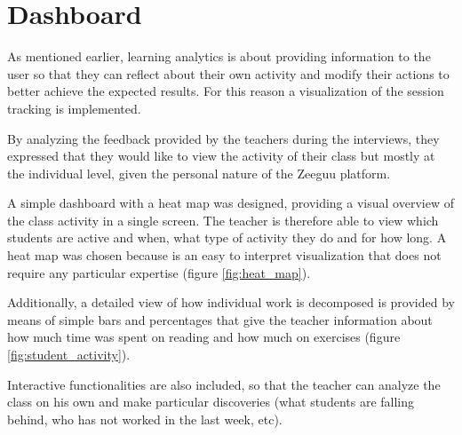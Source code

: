 \chapter{Dashboard}\label{p02:dashboard}

As mentioned earlier, learning analytics is about providing information to the user so that they can reflect about their own activity and modify their actions to better achieve the expected results. For this reason a visualization of the session tracking is implemented.

By analyzing the feedback provided by the teachers during the interviews, they expressed that they would like to view the activity of their class but mostly at the individual level, given the personal nature of the Zeeguu platform.

A simple dashboard with a heat map was designed, providing a visual overview of the class activity in a single screen. The teacher is therefore able to view which students are active and when, what type of activity they do and for how long. A heat map was chosen because is an easy to interpret visualization that does not require any particular expertise (figure \ref{fig:heat_map}).


Additionally, a detailed view of how individual work is decomposed is provided by means of simple bars and percentages that give the teacher information about how much time was spent on reading and how much on exercises (figure \ref{fig:student_activity}).


Interactive functionalities are also included, so that the teacher can analyze the class on his own and make particular discoveries (\Eg what students are falling behind, who has not worked in the last week, etc).


